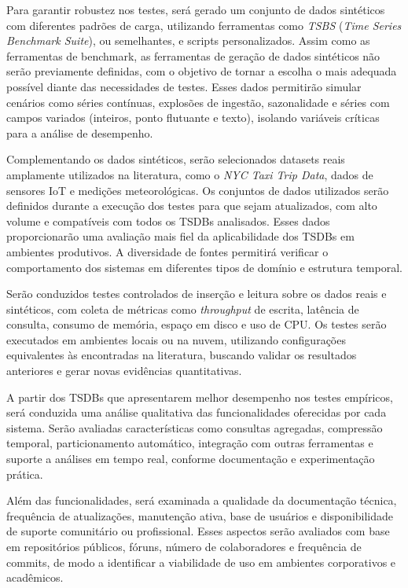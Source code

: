 Para garantir robustez nos testes, será gerado um conjunto de dados sintéticos com diferentes padrões de carga, utilizando ferramentas como \textit{TSBS} (\textit{Time Series Benchmark Suite}), ou semelhantes, e scripts personalizados. Assim como as ferramentas de benchmark, as ferramentas de geração de  dados sintéticos não serão previamente definidas, com o objetivo de tornar a escolha o mais adequada possível diante das necessidades de testes. Esses dados permitirão simular cenários como séries contínuas, explosões de ingestão, sazonalidade e séries com campos variados (inteiros, ponto flutuante e texto), isolando variáveis críticas para a análise de desempenho.

Complementando os dados sintéticos, serão selecionados datasets reais amplamente utilizados na literatura, como o \textit{NYC Taxi Trip Data}, dados de sensores IoT e medições meteorológicas. Os conjuntos de dados utilizados serão definidos durante a execução dos testes para que sejam atualizados, com alto volume e compatíveis com todos os TSDBs analisados. Esses dados proporcionarão uma avaliação mais fiel da aplicabilidade dos TSDBs em ambientes produtivos. A diversidade de fontes permitirá verificar o comportamento dos sistemas em diferentes tipos de domínio e estrutura temporal.

Serão conduzidos testes controlados de inserção e leitura sobre os dados reais e sintéticos, com coleta de métricas como \textit{throughput} de escrita, latência de consulta, consumo de memória, espaço em disco e uso de CPU. Os testes serão executados em ambientes locais ou na nuvem, utilizando configurações equivalentes às encontradas na literatura, buscando validar os resultados anteriores e gerar novas evidências quantitativas.

A partir dos TSDBs que apresentarem melhor desempenho nos testes empíricos, será conduzida uma análise qualitativa das funcionalidades oferecidas por cada sistema. Serão avaliadas características como consultas agregadas, compressão temporal, particionamento automático, integração com outras ferramentas e suporte a análises em tempo real, conforme documentação e experimentação prática.

Além das funcionalidades, será examinada a qualidade da documentação técnica, frequência de atualizações, manutenção ativa, base de usuários e disponibilidade de suporte comunitário ou profissional. Esses aspectos serão avaliados com base em repositórios públicos, fóruns, número de colaboradores e frequência de commits, de modo a identificar a viabilidade de uso em ambientes corporativos e acadêmicos.

